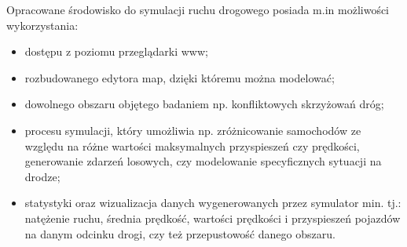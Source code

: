 \documentclass{sprawozdanie-agh}
\begin{document}
		Opracowane środowisko do symulacji ruchu drogowego posiada m.in możliwości wykorzystania:
		\begin{itemize}
			\item dostępu z poziomu przeglądarki www;
			\item rozbudowanego  edytora map, dzięki któremu można modelować;
			\item dowolnego obszaru objętego badaniem np. konfliktowych skrzyżowań dróg;
			\item procesu symulacji, który umożliwia np. zróżnicowanie samochodów ze względu na różne wartości maksymalnych przyspieszeń czy prędkości, generowanie zdarzeń losowych, czy modelowanie specyficznych sytuacji na drodze;
			\item statystyki oraz wizualizacja danych wygenerowanych przez symulator min. tj.: natężenie ruchu, średnia prędkość, wartości prędkości i przyspieszeń pojazdów na danym odcinku drogi, czy też przepustowość danego obszaru.
		\end{itemize}

	{} 
	
\end{document}
